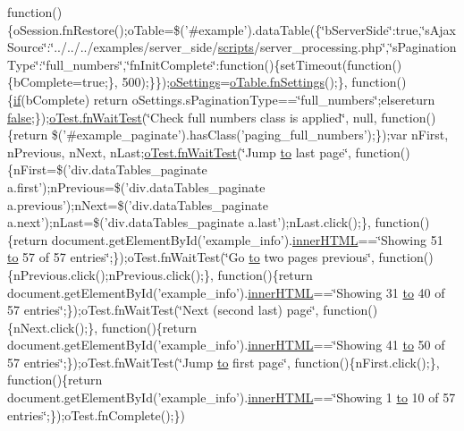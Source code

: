 \begin{DoxyCompactItemize}
function()\{o\+Session.\+fn\+Restore();o\+Table=\$('\#example').data\+Table(\{\char`\"{}b\+Server\+Side\char`\"{}\+:true,\char`\"{}s\+Ajax\+Source\char`\"{}\+:\char`\"{}../../../examples/server\+\_\+side/\hyperlink{tinymce_8jquery_8dev_8js_a09066d4d580eeec222f858d588b4cdef}{scripts}/server\+\_\+processing.\+php\char`\"{},\char`\"{}s\+Pagination\+Type\char`\"{}\+:\char`\"{}full\+\_\+numbers\char`\"{},\char`\"{}fn\+Init\+Complete\char`\"{}\+:function()\{set\+Timeout(function()\{b\+Complete=true;\}, 500);\}\});\hyperlink{model_8settings_8js_a4857b9c813b4dea010668e9555d0aca7}{o\+Settings}=\hyperlink{api_8methods_8js_a78f387fab92a85c2cb7830bc5d8a6141}{o\+Table.\+fn\+Settings}();\}, function()\{\hyperlink{fullpage_2plugin_8js_a8b98017e64ef036adb9ae327ff94abe1}{if}(b\+Complete) return o\+Settings.\+s\+Pagination\+Type==\char`\"{}full\+\_\+numbers\char`\"{};elsereturn \hyperlink{validate_8js_a5df37b7f02e5cdc7d9412b7f872b8e01}{false};\});\hyperlink{onhold_24__server-side_2__zero__config_8js_ab25c4d596771c0133cdc45178ce72c3d}{o\+Test.\+fn\+Wait\+Test}(\char`\"{}Check full numbers class is applied\char`\"{}, null, function()\{return \$('\#example\+\_\+paginate').has\+Class('paging\+\_\+full\+\_\+numbers');\});var n\+First, n\+Previous, n\+Next, n\+Last;\hyperlink{onhold_24__server-side_2__zero__config_8js_ab25c4d596771c0133cdc45178ce72c3d}{o\+Test.\+fn\+Wait\+Test}(\char`\"{}Jump \hyperlink{jquery-ui_8js_af6086621f45baa2cf538f19e45d3c263}{to} last page\char`\"{}, function()\{n\+First=\$('div.\+data\+Tables\+\_\+paginate a.\+first');n\+Previous=\$('div.\+data\+Tables\+\_\+paginate a.\+previous');n\+Next=\$('div.\+data\+Tables\+\_\+paginate a.\+next');n\+Last=\$('div.\+data\+Tables\+\_\+paginate a.\+last');n\+Last.\+click();\}, function()\{return document.\+get\+Element\+By\+Id('example\+\_\+info').\hyperlink{jquery-ui_8js_a87f73c4f0391c1cf9fe60374a76d9a7b}{inner\+H\+T\+M\+L}==\char`\"{}Showing 51 \hyperlink{jquery-ui_8js_af6086621f45baa2cf538f19e45d3c263}{to} 57 of 57 entries\char`\"{};\});o\+Test.\+fn\+Wait\+Test(\char`\"{}Go \hyperlink{jquery-ui_8js_af6086621f45baa2cf538f19e45d3c263}{to} two pages previous\char`\"{}, function()\{n\+Previous.\+click();n\+Previous.\+click();\}, function()\{return document.\+get\+Element\+By\+Id('example\+\_\+info').\hyperlink{jquery-ui_8js_a87f73c4f0391c1cf9fe60374a76d9a7b}{inner\+H\+T\+M\+L}==\char`\"{}Showing 31 \hyperlink{jquery-ui_8js_af6086621f45baa2cf538f19e45d3c263}{to} 40 of 57 entries\char`\"{};\});o\+Test.\+fn\+Wait\+Test(\char`\"{}Next (second last) page\char`\"{}, function()\{n\+Next.\+click();\}, function()\{return document.\+get\+Element\+By\+Id('example\+\_\+info').\hyperlink{jquery-ui_8js_a87f73c4f0391c1cf9fe60374a76d9a7b}{inner\+H\+T\+M\+L}==\char`\"{}Showing 41 \hyperlink{jquery-ui_8js_af6086621f45baa2cf538f19e45d3c263}{to} 50 of 57 entries\char`\"{};\});o\+Test.\+fn\+Wait\+Test(\char`\"{}Jump \hyperlink{jquery-ui_8js_af6086621f45baa2cf538f19e45d3c263}{to} first page\char`\"{}, function()\{n\+First.\+click();\}, function()\{return document.\+get\+Element\+By\+Id('example\+\_\+info').\hyperlink{jquery-ui_8js_a87f73c4f0391c1cf9fe60374a76d9a7b}{inner\+H\+T\+M\+L}==\char`\"{}Showing 1 \hyperlink{jquery-ui_8js_af6086621f45baa2cf538f19e45d3c263}{to} 10 of 57 entries\char`\"{};\});o\+Test.\+fn\+Complete();\})

\end{DoxyCompactItemize}
